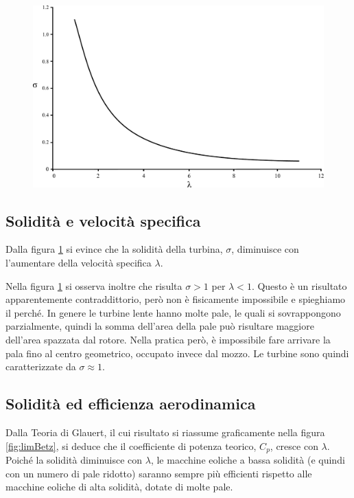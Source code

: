 \begin{figure}[h!]
\centering
  \includegraphics[width=.7\textwidth]{fig/sigmalambda.pdf}
\caption{}
\label{fig:sigmalambda}
\end{figure}
\subsection{Solidità e velocità specifica}
Dalla figura \ref{fig:sigmalambda} si evince che la solidità della turbina, $\sigma$, diminuisce con l'aumentare della velocità specifica $\lambda$. 

Nella figura \ref{fig:sigmalambda} si osserva inoltre che risulta $\sigma > 1$ per $\lambda < 1$. Questo è un risultato apparentemente contraddittorio, però non è fisicamente impossibile e spieghiamo il perché. In genere le turbine lente hanno molte pale, le quali si sovrappongono parzialmente, quindi la somma dell'area della pale può risultare maggiore dell'area spazzata dal rotore. Nella pratica però, è impossibile fare arrivare la pala fino al centro geometrico, occupato invece dal mozzo. Le turbine sono quindi caratterizzate da $\sigma \approx 1$. 

\subsection{Solidità ed efficienza aerodinamica}
Dalla Teoria di Glauert, il cui risultato si riassume graficamente nella figura \ref{fig:limBetz}, si deduce che il coefficiente di potenza teorico, $C_p$, cresce con $\lambda$. Poiché la solidità diminuisce con $\lambda$, le macchine eoliche a bassa solidità (e quindi con un numero di pale ridotto) saranno sempre più efficienti rispetto alle macchine eoliche di alta solidità, dotate di molte pale. 

